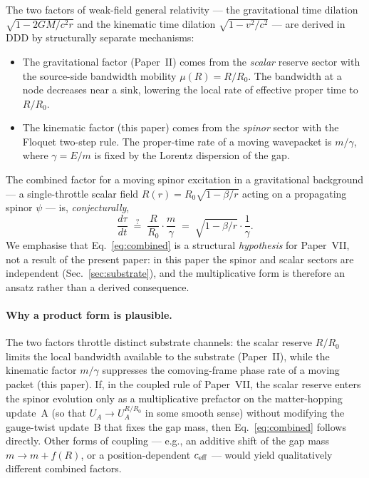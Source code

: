 \documentclass[11pt,a4paper]{article}
\begin{document}
The two factors of weak-field general relativity --- the
gravitational time dilation $\sqrt{1 - 2GM/c^2 r}$ and the
kinematic time dilation $\sqrt{1 - v^2/c^2}$ --- are derived in
DDD by structurally separate mechanisms:
\begin{itemize}
\item The gravitational factor (Paper~II) comes from the
\emph{scalar} reserve sector with the source-side bandwidth
mobility $\mu(R) = R/R_0$. The bandwidth at a node decreases
near a sink, lowering the local rate of effective proper time
to $R/R_0$.
\item The kinematic factor (this paper) comes from the
\emph{spinor} sector with the Floquet two-step rule. The
proper-time rate of a moving wavepacket is $m/\gamma$, where
$\gamma = E/m$ is fixed by the Lorentz dispersion of the gap.
\end{itemize}
The combined factor for a moving spinor excitation in a
gravitational background --- a single-throttle scalar field
$R(r) = R_0 \sqrt{1 - \beta/r}$ acting on a propagating spinor
$\psi$ --- is, \emph{conjecturally},
\begin{equation}
\frac{d\tau}{dt} \;\overset{?}{=}\;
\frac{R}{R_0} \cdot \frac{m}{\gamma}
\;=\; \sqrt{1 - \beta/r} \cdot \frac{1}{\gamma}.
\label{eq:combined}
\end{equation}
We emphasise that Eq.~\eqref{eq:combined} is a structural
\emph{hypothesis} for Paper~VII, not a result of the present
paper: in this paper the spinor and scalar sectors are
independent (Sec.~\ref{sec:substrate}), and the multiplicative
form is therefore an ansatz rather than a derived consequence.

\paragraph{Why a product form is plausible.}
The two factors throttle distinct substrate channels: the
scalar reserve $R/R_0$ limits the local bandwidth available to
the substrate (Paper~II), while the kinematic factor $m/\gamma$
suppresses the comoving-frame phase rate of a moving packet
(this paper). If, in the coupled rule of Paper~VII, the scalar
reserve enters the spinor evolution only as a multiplicative
prefactor on the matter-hopping update~A (so that
$U_A \to U_A^{R/R_0}$ in some smooth sense) without modifying
the gauge-twist update~B that fixes the gap mass, then
Eq.~\eqref{eq:combined} follows directly. Other forms of
coupling --- e.g., an additive shift of the gap mass
$m \to m + f(R)$, or a position-dependent $c_{\rm eff}$ ---
would yield qualitatively different combined factors.
\end{document}
